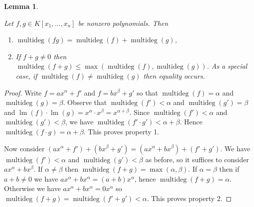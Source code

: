 \documentclass[
]{book}
\newtheorem{lemma}{Lemma}[chapter]
\theoremstyle{definition}
\theoremstyle{definition}
\theoremstyle{definition}
\theoremstyle{definition}
\theoremstyle{remark}
\begin{document}
\begin{lemma}
\protect\hypertarget{lem:multideg}{}\label{lem:multideg}

Let \(f,g \in K[x_1,\ldots,x_n]\) be nonzero polynomials. Then

\begin{enumerate}
\def\labelenumi{\arabic{enumi}.}
\item
  \(\operatorname{multideg}(fg) = \operatorname{multideg}(f) + \operatorname{multideg}(g)\),
\item
  If \(f+g \ne 0\) then \(\operatorname{multideg}(f+g) \le \max(\operatorname{multideg}(f), \operatorname{multideg}(g))\).
  As a special case, if \(\operatorname{multideg}(f) \ne \operatorname{multideg}(g)\) then equality occurs.
\end{enumerate}

\end{lemma}

\begin{proof}
Write \(f = ax^\alpha + f'\) and \(f = bx^\beta + g'\) so that \(\operatorname{multideg}(f) = \alpha\) and \(\operatorname{multideg}(g) = \beta\). Observe that \(\operatorname{multideg}(f') < \alpha\) and \(\operatorname{multideg}(g') = \beta\) and \(\operatorname{lm}(f) \cdot \operatorname{lm}(g) = x^\alpha \cdot x^\beta = x^{\alpha + \beta}\). Since \(\operatorname{multideg}(f') < \alpha\) and \(\operatorname{multideg}(g') < \beta\), we have \(\operatorname{multideg}(f' \cdot g') < \alpha + \beta\). Hence \(\operatorname{multideg}(f \cdot g) = \alpha + \beta\). This proves property 1.

Now consider \((ax^\alpha + f') + (bx^\beta + g') = (ax^\alpha + bx^\beta) + (f' + g')\). We have \(\operatorname{multideg}(f') < \alpha\) and \(\operatorname{multideg}(g') < \beta\) as before, so it suffices to consider \(ax^\alpha + bx^\beta\). If \(\alpha \ne \beta\) then \(\operatorname{multideg}(f+g) = \max(\alpha, \beta)\). If \(\alpha = \beta\) then if \(a+b\ne 0\) we have \(ax^\alpha + bx^\alpha = (a+b)x^\alpha\), hence \(\operatorname{multideg}(f+g) = \alpha\). Otherwise we have \(ax^\alpha + bx^\alpha = 0x^\alpha\) so \(\operatorname{multideg}(f + g) = \operatorname{multideg}(f' + g') < \alpha\). This proves property 2.
\end{proof}
\end{document}
